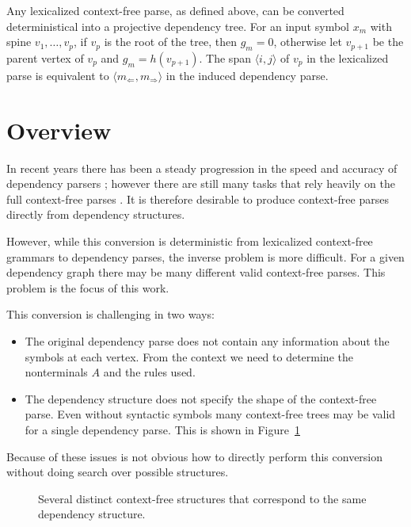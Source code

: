 \documentclass[11pt,letterpaper]{article}
\newcommand{\Left}[1]{#1_{\Leftarrow}}
\newcommand{\Right}[1]{#1_{\Rightarrow}}
\newcommand{\Span}[1]{\langle #1 \rangle}
\begin{document}
Any lexicalized context-free parse, as defined above, can be converted
deterministical into a projective dependency tree. For an input symbol
$x_m$ with spine $v_1, \ldots, v_p$, if $v_p$ is the root of the tree,
then $g_m = 0$, otherwise let $v_{p+1}$ be the parent vertex of
$v_p$ and $g_m = h(v_{p+1})$. The span $\Span{i, j}$ of
$v_p$ in the lexicalized parse is equivalent to $\Span{\Left{m}, \Right{m}}$
in the induced dependency parse.

\section{Overview}

In recent years there has been a steady progression in the speed and accuracy of dependency parsers \cite{}; however
there are still many tasks that rely heavily on the full context-free parses \cite{}. It is therefore desirable
to produce context-free parses directly from dependency structures.

However, while this conversion is deterministic from lexicalized context-free grammars
to dependency parses, the inverse problem is more difficult. For a given dependency
graph there may be many different valid context-free parses. This problem is the focus of this work.

This conversion is challenging in two ways:

\begin{itemize}
\item The original dependency parse does not contain any information about the symbols at each vertex. From the context we need to
determine the nonterminals $A$ and the rules used.

\item The dependency structure does not specify the shape of the context-free parse. Even without syntactic symbols many
context-free trees may be valid for a single dependency parse. This is shown in Figure~\ref{}
\end{itemize}


Because of these issues is not obvious how to directly perform this conversion without doing search over possible structures.




\begin{figure}
  \centering
  \caption{Several distinct context-free structures that correspond to the same dependency structure.}
\end{figure}
\end{document}
